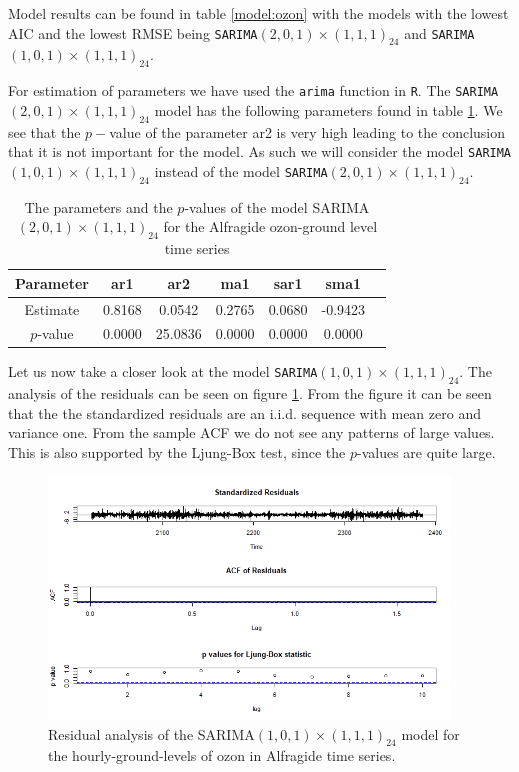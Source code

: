 \documentclass{article}
\begin{document}
Model results can be found in table \ref{model:ozon} with the models with the lowest AIC and the lowest RMSE being \verb|SARIMA|$(2,0,1) \times (1,1,1)_{24}$ and \verb|SARIMA|$(1,0,1) \times (1,1,1)_{24}$.

For estimation of parameters we have used the \verb|arima| function in \verb|R|.  The \verb|SARIMA|$(2,0,1) \times (1,1,1)_{24}$ model has the following parameters found 
in table \ref{par:ozon}. We see that the $p-$value of the parameter ar2 is very high leading to the 
conclusion that it is not important for the model. As such we will consider the model \verb|SARIMA|$(1,0,1) \times (1,1,1)_{24}$ instead of the model \verb|SARIMA|$(2,0,1) \times (1,1,1)_{24}$.


\begin{table}[ht!]
    \centering
    \begin{tabular}{|c|c|c|c|c|c|c|} \hline
        Parameter & ar1 & ar2 & ma1 & sar1 & sma1  \\ \hline
        Estimate & 0.8168 & 0.0542 & 0.2765 & 0.0680 & -0.9423  \\ \hline
        $p$-value & 0.0000 & 25.0836 & 0.0000 & 0.0000 & 0.0000  \\ \hline
    \end{tabular}
    \caption{The parameters and the $p$-values of the model SARIMA$(2,0,1) \times (1,1,1)_{24}$ for the Alfragide ozon-ground level time series}
    \label{par:ozon}
\end{table}


Let us now take a closer look at the model \verb|SARIMA|$(1,0,1) \times (1,1,1)_{24}$. The analysis of the residuals
can be seen on figure  \ref{fig:res_o}. From the figure it can be seen that the the standardized 
residuals are an i.i.d. sequence with mean zero and variance one. From the sample ACF we do not see any 
patterns of large values. This is also supported by the Ljung-Box test, since the $p$-values are quite large.


\begin{figure}[ht!]
    \centering
    \includegraphics[width=0.95\textwidth]{Plots1/res_a.png}
    \caption{Residual analysis of the SARIMA$(1,0,1) \times (1,1,1)_{24}$ model
    for the hourly-ground-levels of ozon in Alfragide time series.}
    \label{fig:res_o}
\end{figure}
\end{document}
